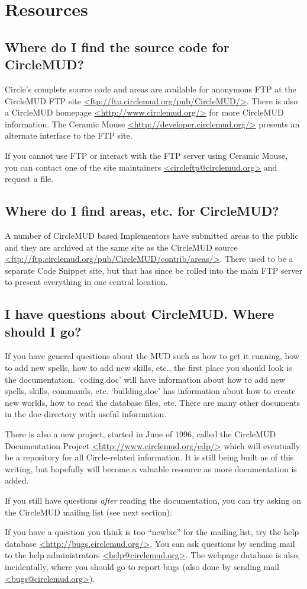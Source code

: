 \documentclass[11pt]{article}
\begin{document}
\section{Resources}
\subsection{Where do I find the source code for CircleMUD?}
Circle's complete source code and areas are available for anonymous FTP at the CircleMUD FTP site \url{<ftp://ftp.circlemud.org/pub/CircleMUD/>}.  There is also a CircleMUD homepage \url{<http://www.circlemud.org/>} for more CircleMUD information.  The Ceramic Mouse \url{<http://developer.circlemud.org/>} presents an alternate interface to the FTP site.
\par
If you cannot use FTP or interact with the FTP server using Ceramic Mouse, you can contact one of the site maintainers \url{<circleftp@circlemud.org>} and request a file.

\subsection{Where do I find areas, etc. for CircleMUD?}
A number of CircleMUD based Implementors have submitted areas to the public and they are
archived at the same site as the CircleMUD source \url{<ftp://ftp.circlemud.org/pub/CircleMUD/contrib/areas/>}.   There used to be a separate Code Snippet site, but that has since be rolled into the main FTP server to present everything in one central location.

\subsection{I have questions about CircleMUD.  Where should I go?}
If you have general questions about the MUD such as how to get it running, how to add new spells, how to add new skills, etc., the first place you should look is the documentation. `coding.doc' will have information about how to add new spells, skills, commands, etc.  `building.doc' has
information about how to create new worlds, how to read the database files, etc. There are many other documents in the doc directory with useful information. 
\par
There is also a new project, started in June of 1996, called the CircleMUD Documentation Project \url{<http://www.circlemud.org/cdp/>} which will eventually be a repository for all Circle-related information.  It is still being built as of this writing, but hopefully will become a valuable resource as more documentation is added.
\par
If you still have questions {\em after} reading the documentation, you can try asking on the CircleMUD mailing list (see next section).
\par
If you have a question you think is too ``newbie'' for the mailing list, try the help database \url{<http://bugs.circlemud.org/>}.  You can ask questions by sending mail to the help administrators \url{<help@circlemud.org>}.  The webpage database is also, incidentally, where you should go to report bugs (also done by sending mail \url{<bugs@circlemud.org>}).
\end{document}
